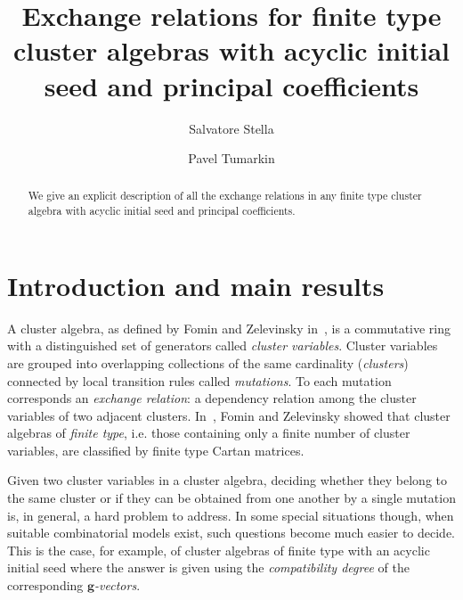 \documentclass[11pt]{amsart}
\newcommand{\bg}{\mathbf{g}}
\theoremstyle{definition}
\numberwithin{equation}{section}
\numberwithin{figure}{section}
\begin{document}
\title[Exchange relations for finite type cluster algebras]{Exchange relations for finite type cluster algebras with acyclic initial seed and principal coefficients}

\author[Stella]{Salvatore Stella}
\address[Salvatore Stella]{IN$d$AM - Marie Curie Actions fellow, Universit\`a ``La Sapienza'', Roma, Italy.}

\author[tumarkin]{Pavel Tumarkin}
\address[Pavel Tumarkin]{Department of Mathematical Sciences, Durham University, UK}

\begin{abstract}
We give an explicit description of all the exchange relations in any finite type cluster algebra with acyclic initial seed and principal coefficients.
\end{abstract}

\maketitle

\section{Introduction and main results}
  A cluster algebra, as defined by Fomin and Zelevinsky in~\cite{FZ02}, is a commutative ring with a distinguished set of generators called \emph{cluster variables}. 
  Cluster variables are grouped into overlapping collections of the same cardinality (\emph{clusters}) connected by local transition rules called \emph{mutations}.
  To each mutation corresponds an \emph{exchange relation}: a dependency relation among the cluster variables of two adjacent clusters.
  In~\cite{FZ03}, Fomin and Zelevinsky showed that cluster algebras of \emph{finite type}, i.e. those containing only a finite number of cluster variables, are classified by finite type Cartan matrices.

  Given two cluster variables in a cluster algebra, deciding whether they belong to the same cluster or if they can be obtained from one another by a single mutation is, in general, a hard problem to address.
  In some special situations though, when suitable combinatorial models exist, such questions become much easier to decide.
  This is the case, for example, of cluster algebras of finite type with an acyclic initial seed where the answer is given using the \emph{compatibility degree} of the corresponding \emph{$\bg$-vectors}.
  
\end{document}
